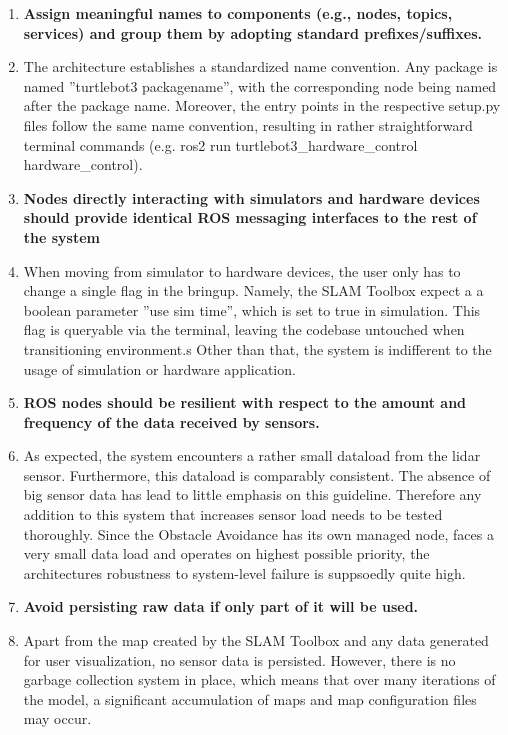 \documentclass[%
paper=A4,               %
twoside=true,           %
openright,              %
11pt,                   %
bibliography=totoc,     %
titlepage=on,           %
DIV=12,                 %
BCOR=1.5cm,             %
parskip=half,            %
final
]{scrreprt}
\begin{document}
\begin{enumerate}[leftmargin=9mm, align=left]
		\item  \textbf{Assign meaningful names to components (e.g., nodes, topics, services) and group them by adopting standard prefixes/suffixes.} 
		\item[] The architecture establishes a standardized name convention. Any package is named ”turtlebot3 packagename”, with the corresponding node being named after the package name. Moreover, the entry points in the respective setup.py files follow the same name convention, resulting in rather straightforward terminal commands (e.g. ros2 run turtlebot3\_hardware\_control hardware\_control). 
		
		
		\item  \textbf{Nodes directly interacting with simulators and hardware devices should provide identical ROS messaging interfaces to the rest of the system} 
		\item[] When moving from simulator to hardware devices, the user only has to change a single flag in the bringup. Namely, the SLAM Toolbox expect a a boolean parameter ”use sim time”, which is set to true in simulation. This flag is queryable via the terminal, leaving the codebase untouched when transitioning environment.s Other than that, the system is indifferent to the usage of simulation or hardware application.
		
		\item \textbf{ROS nodes should be resilient with respect to the amount and frequency of the data received by sensors.} 
		\item[] As expected, the system encounters a rather small dataload from the lidar sensor. Furthermore, this dataload is comparably consistent. The absence of big sensor data has lead to little emphasis on this guideline. Therefore any addition to this system that increases sensor load needs to be tested thoroughly. Since the Obstacle Avoidance has its own managed node, faces a very small data load and operates on highest possible priority, the architectures robustness to system-level failure is suppsoedly quite high.
		
		\item \textbf{Avoid persisting raw data if only part of it will be used.}
		\item[] Apart from the map created by the SLAM Toolbox and any data generated for user visualization, no sensor data is persisted. However, there is no garbage collection system in place, which means that over many iterations of the model, a significant accumulation of maps and map configuration files may occur.
		
		
	\end{enumerate}
	
\end{document}
